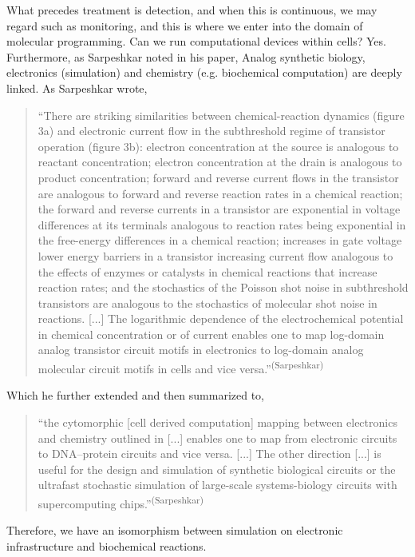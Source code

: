 What precedes treatment is detection, and when this is continuous, we may regard such as monitoring, and this is where we enter into the domain of molecular programming. Can we run computational devices within cells? Yes. Furthermore, as Sarpeshkar noted in his paper, Analog synthetic biology, electronics (simulation) and chemistry (e.g. biochemical computation) are deeply linked. As Sarpeshkar wrote,
\begin{quotation}
    ``There are striking similarities between chemical-reaction dynamics (figure 3a) and electronic current flow in the subthreshold regime of transistor operation (figure 3b): electron concentration at the source is analogous to reactant concentration; electron concentration at the drain is analogous to product concentration; forward and reverse current flows in the transistor are analogous to forward and reverse reaction rates in a chemical reaction; the forward and reverse currents in a transistor are exponential in voltage differences at its terminals analogous to reaction rates being exponential in the free-energy differences in a chemical reaction; increases in gate voltage lower energy barriers in a transistor increasing current flow analogous to the effects of enzymes or catalysts in chemical reactions that increase reaction rates; and the stochastics of the Poisson shot noise in subthreshold transistors are analogous to the stochastics of molecular shot noise in reactions. [...] The logarithmic dependence of the electrochemical potential in chemical concentration or of current enables one to map log-domain analog transistor circuit motifs in electronics to log-domain analog molecular circuit motifs in cells and vice versa.''\textsuperscript{(Sarpeshkar)}
\end{quotation}

Which he further extended and then summarized to, \begin{quotation}
    ``the cytomorphic [cell derived computation] mapping between electronics and chemistry outlined in [...] enables one to map from electronic circuits to DNA–protein circuits and vice versa. [...] The other direction [...] is useful for the design and simulation of synthetic biological circuits or the ultrafast stochastic simulation of large-scale systems-biology circuits with supercomputing chips.''\textsuperscript{(Sarpeshkar)}
\end{quotation}

Therefore, we have an isomorphism between simulation on electronic infrastructure and biochemical reactions.


